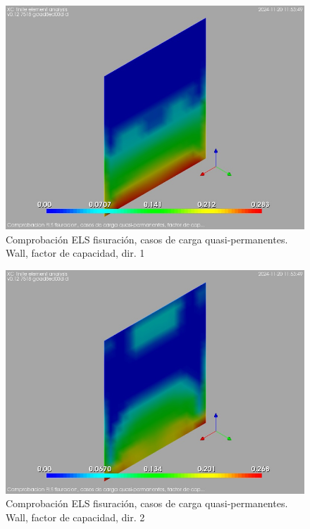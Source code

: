 \begin{figure}[ht]
\begin{center}
\includegraphics[width=\linewidth]{results/graphics/crackingSLS_qperm/wallCFSect1}
\caption{Comprobación ELS fisuración, casos de carga quasi-permanentes. Wall, factor de capacidad, dir. 1}
\label{SLS_quasiPermanentLoadsCrackControlwallCFSect1}
\end{center}
\end{figure}
\begin{figure}[ht]
\begin{center}
\includegraphics[width=\linewidth]{results/graphics/crackingSLS_qperm/wallCFSect2}
\caption{Comprobación ELS fisuración, casos de carga quasi-permanentes. Wall, factor de capacidad, dir. 2}
\label{SLS_quasiPermanentLoadsCrackControlwallCFSect2}
\end{center}
\end{figure}
